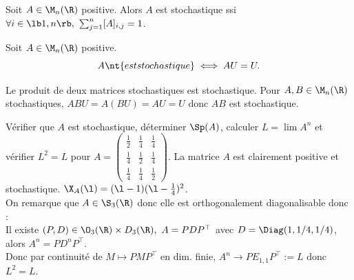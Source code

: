 \documentclass[11pt]{article}
\begin{document}
\begin{defi}{}{}
    Soit $A\in\M_n(\R)$ positive. Alors $A$ est stochastique ssi $\forall i \in \lb1,n\rb, ~ \sum_{j=1}^n [A]_{i,j} = 1$.
\end{defi}

\vspace*{-0.8cm}

\begin{prop}{}{}
    Soit $A \in \M_n(\R)$ positive.
    \begin{equation*}
        A \nt{ est stochastique } \iff AU=U.
    \end{equation*}
\end{prop}

\vspace*{-0.8cm}

\begin{prop}{}{}
    Le produit de deux matrices stochastiques est stochastique.
    \tcblower
    Pour $A,B\in \M_n(\R)$ stochastiques, $ABU=A(BU)=AU=U$ donc $AB$ est stochastique.
\end{prop}

\vspace*{-0.8cm}

\begin{exercice}{}{}
    Vérifier que $A$ est stochastique, déterminer $\Sp(A)$, calculer $L=\lim A^n$ et vérifier $L^2=L$ pour $A=\begin{pmatrix} \frac{1}{2} & \frac{1}{4} & \frac{1}{4} \\[0.1cm] \frac{1}{4} & \frac{1}{2} & \frac{1}{4} \\[0.1cm] \frac{1}{4} & \frac{1}{4} & \frac{1}{2} \end{pmatrix}$.
    \tcblower
    La matrice $A$ est clairement positive et stochastique. $\X_A(\l) = (\l-1)(\l-\frac{1}{4})^2$.\\
    On remarque que $A\in\S_3(\R)$ donc elle est orthogonalement diagonalisable donc :\\
    Il existe $(P,D)\in\O_3(\R)\times D_3(\R), ~ A=PDP^\top$ avec $D=\Diag(1,1/4,1/4)$, alors $A^n=PD^nP^\top$.\\
    Donc par continuité de $M\mapsto PMP^\top$ en dim. finie, $A^n \to PE_{1,1}P^{\top}:=L$ donc $L^2=L$.
\end{exercice}
\end{document}
